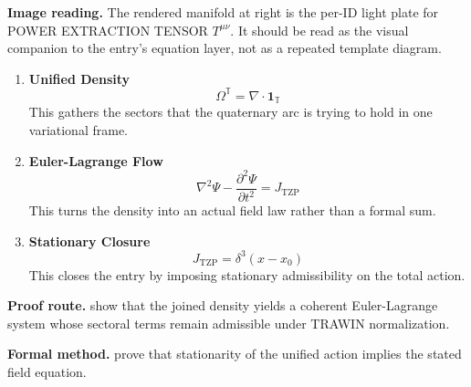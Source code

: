 \begin{samepage}
\noindent\begin{minipage}[t]{0.45\linewidth}
\vspace{0pt}
\raggedright
\scriptsize\textbf{Image reading.} The rendered manifold at right is the per-ID light plate for POWER EXTRACTION TENSOR \(T^{\mu\nu}\). It should be read as the visual companion to the entry's equation layer, not as a repeated template diagram.\par
\end{minipage}\hfill
\begin{minipage}[t]{0.53\linewidth}
\vspace*{-0.10in}
\raggedright
{}
\end{minipage}
\end{samepage}

\clearpage


\begin{enumerate}[leftmargin=1.6em,itemsep=9pt,topsep=6pt]
\item \textbf{Unified Density}
\[
\Omega^{\mathbb{T}}=\nabla\cdot\mathbf{1}_{\mathbb{T}}
\]
This gathers the sectors that the quaternary arc is trying to hold in one variational frame.

\item \textbf{Euler-Lagrange Flow}
\[
\nabla^{2}\Psi-\frac{\partial^{2}\Psi}{\partial t^{2}}=J_{\mathrm{TZP}}
\]
This turns the density into an actual field law rather than a formal sum.

\item \textbf{Stationary Closure}
\[
J_{\mathrm{TZP}}=\delta^{3}(x-x_{0})
\]
This closes the entry by imposing stationary admissibility on the total action.
\end{enumerate}

\textbf{Proof route.} show that the joined density yields a coherent Euler-Lagrange system whose sectoral terms remain admissible under TRAWIN normalization.

\textbf{Formal method.} prove that stationarity of the unified action implies the stated field equation.

\medskip
{}

